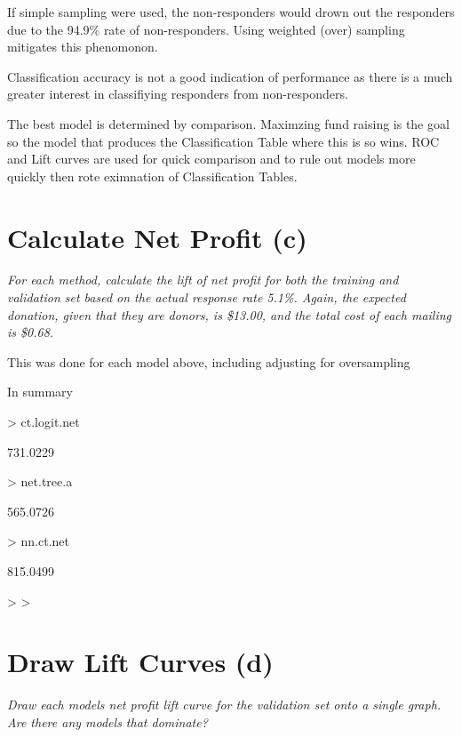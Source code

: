 \documentclass{article}
\begin{document}
\noindent
\newline
If simple sampling were used, the non-responders would drown out the responders due to the 94.9\% rate of non-responders. Using weighted (over) sampling mitigates this phenomonon. 

\noindent
\newline
Classification accuracy is not a good indication of performance as there is a much greater interest in classifiying responders from non-responders.

\noindent
The best model is determined by comparison. Maximzing fund raising is the goal so the model that produces the Classification Table where this is so wins. ROC and Lift curves are used for quick comparison and to rule out models more quickly then rote eximnation of Classification Tables. 

\section*{Calculate Net Profit (c)}
{\it
For each method, calculate the lift of net profit for both the training and validation set based on the actual response rate 5.1\%. Again, the expected donation, given that they are donors, is \$13.00, and the total cost of each mailing is \$0.68.}

\noindent
\newline
This was done for each model above, including adjusting for oversampling

\noindent
\newline
In summary
\begin{Schunk}
\begin{Sinput}
> ct.logit.net
\end{Sinput}
\begin{Soutput}
[1] 731.0229
\end{Soutput}
\begin{Sinput}
> net.tree.a
\end{Sinput}
\begin{Soutput}
[1] 565.0726
\end{Soutput}
\begin{Sinput}
> nn.ct.net
\end{Sinput}
\begin{Soutput}
[1] 815.0499
\end{Soutput}
\begin{Sinput}
> 
> 
\end{Sinput}
\end{Schunk}
\section*{Draw Lift Curves (d)}
{\it
Draw each models net profit lift curve for the validation set onto a single graph. Are there
any models that dominate?}
\end{document}
